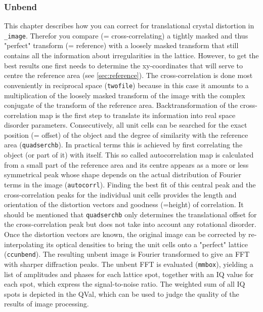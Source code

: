\subsubsection{Unbend}
\label{sec:Unbend}

This chapter describes how you can correct for translational crystal distortion in {\twodx}\texttt{\_image}. Therefor you compare (= cross-correlating) a tightly masked and thus "perfect" transform (= reference) with a loosely masked transform that still contains all the information about irregularities in the lattice. However, to get the best results one first needs to determine the xy-coordinates that will serve to centre the reference area (see  \autoref{sec:reference}). The cross-correlation is done most conveniently in reciprocal space (\texttt{twofile}) because in this case it amounts to a multiplication of the loosely masked transform of the image with the complex conjugate of the transform of the reference area. Backtransformation of the cross-correlation map is the first step to translate its information into real space disorder parameters. Consecutively, all unit cells can be searched for the exact position (= offset) of the object and the degree of similarity with the reference area (\texttt{quadserchb}). In practical terms this is achieved by first correlating the object (or part of it) with itself. This so called autocorrelation map is calculated from a small part of the reference area and its centre appears as a more or less symmetrical peak whose shape depends on the actual distribution of Fourier terms in the image (\texttt{autocorrl}). Finding the best fit of this central peak and the cross-correlation peaks for the individual unit cells provides the length and orientation of the distortion vectors and goodness (=height) of correlation. It should be mentioned that \texttt{quadserchb} only determines the translational offset for the cross-correlation peak but does not take into account any rotational disorder. Once the distortion vectors are known, the original image can be corrected by re-interpolating its optical densities to bring the unit cells onto a "perfect" lattice (\texttt{ccunbend}). The resulting unbent image is Fourier transformed to give an FFT with sharper diffraction peaks. The unbent FFT is evaluated (\texttt{mmbox}), yielding a list of amplitudes and phases for each lattice spot, together with an IQ value for each spot, which express the signal-to-noise ratio. The weighted sum of all IQ spots is depicted in the QVal, which can be used to judge the quality of the results of image processing.

